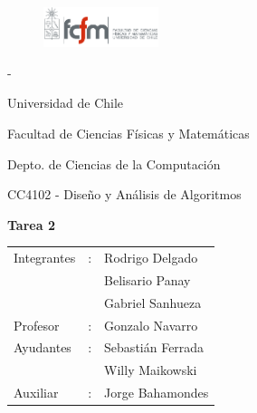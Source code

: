 \documentclass[letterpaper,10pt]{article}
\begin{document}
	\begin{titlepage}

		\begin{figure}
			\includegraphics[width=0.3\textwidth]{logoFCFM.png}
		\end{figure}

		\noindent \phantom - %

		Universidad de Chile

		Facultad de Ciencias Físicas y Matemáticas

		Depto. de Ciencias de la Computación

		CC4102 - Diseño y Análisis de Algoritmos

		\vfill

		\begin{center}
			\begin{Huge}
				{\textbf{Tarea 2}}
			\end{Huge}
		\end{center}

		\vfill

		\begin{flushright}
			\begin{tabular}{lll}
				Integrantes	&:	& Rodrigo Delgado\\
						&	& Belisario Panay\\
						&	& Gabriel Sanhueza\\
				Profesor	&:	& Gonzalo Navarro\\
				Ayudantes	&:	& Sebastián Ferrada\\
						&	& Willy Maikowski\\
				Auxiliar	&:	& Jorge Bahamondes\\
			\end{tabular}
		\end{flushright}

	\end{titlepage}

	\newpage
\end{document}
